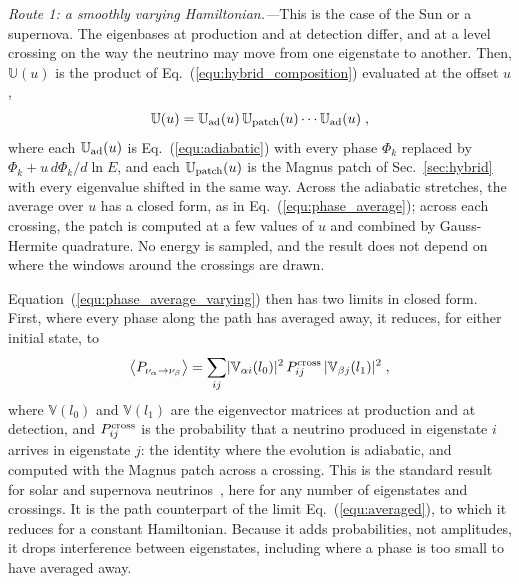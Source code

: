 \documentclass[final,5p,times,twocolumn,sort,compress]{elsarticle}
\makeatletter
\newcommand{\eq}{Eq.}
\DeclareRobustCommand{\_}{%
  \ifmmode\nfss@text{\textunderscore}\else\textunderscore\allowbreak\fi}
\newcommand{\equ}[1]{\eq~(\ref{equ:#1})}
\makeatother
\begin{document}
\textit{Route 1: a smoothly varying Hamiltonian.---}This is the case of the Sun or a supernova. The eigenbases at production and at detection differ, and at a level crossing on the way the neutrino may move from one eigenstate to another. Then, $\mathbb{U}(u)$ is the product of \equ{hybrid_composition} evaluated at the offset $u$,
\begin{equation}
 \label{equ:evolution_offset}
 \mathbb{U}(u)
 =
 \mathbb{U}_{\rm ad}(u)\,\mathbb{U}_{\rm patch}(u) \cdots \mathbb{U}_{\rm ad}(u) \;,
\end{equation}
where each $\mathbb{U}_{\rm ad}(u)$ is \equ{adiabatic} with every phase $\Phi_k$ replaced by $\Phi_k + u\, d\Phi_k/d\ln E$, and each $\mathbb{U}_{\rm patch}(u)$ is the Magnus patch of Sec.~\ref{sec:hybrid} with every eigenvalue shifted in the same way. Across the adiabatic stretches, the average over $u$ has a closed form, as in \equ{phase_average}; across each crossing, the patch is computed at a few values of $u$ and combined by Gauss-Hermite quadrature. No energy is sampled, and the result does not depend on where the windows around the crossings are drawn.

Equation~(\ref{equ:phase_average_varying}) then has two limits in closed form. First, where every phase along the path has averaged away, it reduces, for either initial state, to
\begin{equation}
 \label{equ:averaged_varying}
 \left\langle P_{\nu_\alpha \to \nu_\beta} \right\rangle
 =
 \sum_{ij} \lvert \mathbb{V}_{\alpha i}(l_0)\rvert^2\,
 P^{\rm cross}_{ij}\,
 \lvert \mathbb{V}_{\beta j}(l_1)\rvert^2 \;,
\end{equation}
where $\mathbb{V}(l_0)$ and $\mathbb{V}(l_1)$ are the eigenvector matrices at production and at detection, and $P^{\rm cross}_{ij}$ is the probability that a neutrino produced in eigenstate $i$ arrives in eigenstate $j$: the identity where the evolution is adiabatic, and computed with the Magnus patch across a crossing. This is the standard result for solar and supernova neutrinos\ \cite{Kuo:1989qe, Dighe:1999bi}, here for any number of eigenstates and crossings. It is the path counterpart of the limit \equ{averaged}, to which it reduces for a constant Hamiltonian. Because it adds probabilities, not amplitudes, it drops interference between eigenstates, including where a phase is too small to have averaged away.
\end{document}

